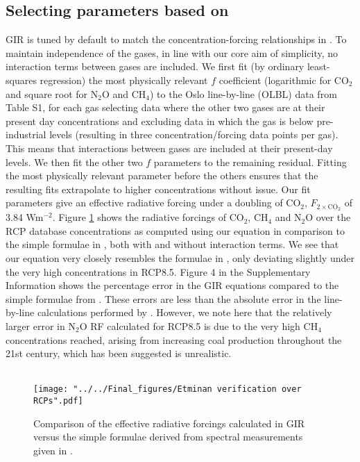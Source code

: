 \documentclass[gmd, manuscript]{copernicus}
\begin{document}
\subsection*{Selecting parameters based on \cite{Etminan2016}}
GIR is tuned by default to match the concentration-forcing relationships in \cite{Etminan2016}. To maintain independence of the gases, in line with our core aim of simplicity, no interaction terms between gases are included. We first fit (by ordinary least-squares regression) the most physically relevant $f$ coefficient (logarithmic for CO$_2$ and square root for N$_2$O and CH$_4$) to the Oslo line-by-line (OLBL) data from \cite{Etminan2016} Table S1, for each gas selecting data where the other two gases are at their present day concentrations and excluding data in which the gas is below pre-industrial levels (resulting in three concentration/forcing data points per gas). This means that interactions between gases are included at their present-day levels. We then fit the other two $f$ parameters to the remaining residual. Fitting the most physically relevant parameter before the others ensures that the resulting fits extrapolate to higher concentrations without issue. Our fit parameters give an effective radiative forcing under a doubling of CO$_2$, $F_{2\times \text{CO}_2}$ of 3.84 Wm$^{-2}$. Figure \ref{fig:EtminanRCP} shows the radiative forcings of CO$_2$, CH$_4$ and N$_2$O over the RCP database concentrations as computed using our equation in comparison to the simple formulae in \citeauthor{Etminan2016}, both with and without interaction terms. We see that our equation very closely resembles the formulae in \citeauthor{Etminan2016}, only deviating slightly under the very high concentrations in RCP8.5. Figure 4 in the Supplementary Information shows the percentage error in the GIR equations compared to the simple formulae from \citeauthor{Etminan2016}. These errors are less than the absolute error in the line-by-line calculations performed by \citeauthor{Etminan2016}. However, we note here that the relatively larger error in N$_2$O RF calculated for RCP8.5 is due to the very high CH$_4$ concentrations reached, arising from increasing coal production throughout the 21st century, which has been suggested is unrealistic.\\\\

\begin{figure}[t]
    \texttt{[image: "../../Final\_figures/Etminan verification over RCPs".pdf]}
    \caption{Comparison of the effective radiative forcings calculated in GIR versus the simple formulae derived from spectral measurements given in \cite{Etminan2016}.}
    \label{fig:EtminanRCP}
\end{figure}
\end{document}
